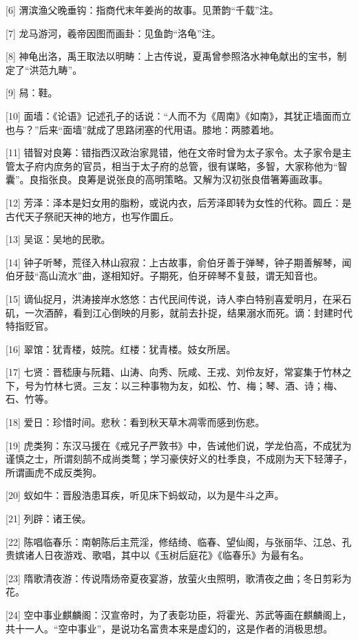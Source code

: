 \documentclass[12pt,UTF8]{ctexbook}
\begin{document}
[6] 渭滨渔父晚垂钩：指商代末年姜尚的故事。见萧韵“千载”注。

[7] 龙马游河，羲帝因图而画卦：见鱼韵“洛龟”注。

[8] 神龟出洛，禹王取法以明畴：上古传说，夏禹曾参照洛水神龟献出的宝书，制定了“洪范九畴”。

[9] 舄：鞋。

[10] 面墙：《论语》记述孔子的话说：“人而不为《周南》《如南》，其犹正墙面而立也与？”后来“面墙”就成了思路闭塞的代用语。膝地：两膝着地。

[11] 错智对良筹：错指西汉政治家晁错，他在文帝时曾为太子家令。太子家令是主管太子府内庶务的官员，相当于太子府的总管，很有谋略，多智，大家称他为“智囊”。良指张良。良筹是说张良的高明策略。又解为汉初张良借箸筹画政事。

[12] 芳泽：泽本是妇女用的脂粉，或说内衣，后芳泽即转为女性的代称。圆丘：是古代天子祭祀天神的地方，也写作圜丘。

[13] 吴讴：吴地的民歌。

[14] 钟子听琴，荒径入林山寂寂：上古故事，俞伯牙善于弹琴，钟子期善解琴，闻伯牙鼓“高山流水”曲，遂相知好。子期死，伯牙碎琴不复鼓，谓无知音也。

[15] 谪仙捉月，洪涛接岸水悠悠：古代民间传说，诗人李白特别喜爱明月，在采石矶，一次酒醉，看到江心倒映的月影，就前去扑捉，结果溺水而死。谪：封建时代特指贬官。

[16] 翠馆：犹青楼，妓院。红楼：犹青楼。妓女所居。

[17] 七贤：晋嵇康与阮籍、山涛、向秀、阮咸、王戎、刘伶友好，常宴集于竹林之下，号为竹林七贤。三友：以三种事物为友，如松、竹、梅；琴、酒、诗；梅、石、竹等。

[18] 爱日：珍惜时间。悲秋：看到秋天草木凋零而感到伤悲。

[19] 虎类狗：东汉马援在《戒兄子严敦书》中，告诫他们说，学龙伯高，不成犹为谨慎之士，所谓刻鹄不成尚类鹜；学习豪侠好义的杜季良，不成刚为天下轻薄子，所谓画虎不成反类狗。

[20] 蚁如牛：晋殷浩患耳疾，听见床下蚂蚁动，以为是牛斗之声。

[21] 列辟：诸王侯。

[22] 陈唱临春乐：南朝陈后主荒淫，修结绮、临春、望仙阁，与张丽华、江总、孔贵嫔诸人日夜游戏、歌唱，其中以《玉树后庭花》《临春乐》为最有名。

[23] 隋歌清夜游：传说隋炀帝夏夜宴游，放萤火虫照明，歌清夜之曲；冬日剪彩为花。

[24] 空中事业麒麟阁：汉宣帝时，为了表彰功臣，将霍光、苏武等画在麒麟阁上，共十一人。“空中事业”，是说功名富贵本来是虚幻的，这是作者的消极思想。
\end{document}
